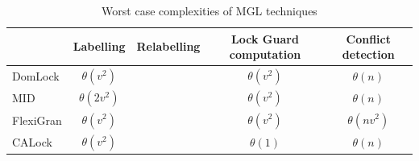 \begin{table}
	\centering
	\captionsetup{justification=centering}
	\begin{tabular}{l | cccc}
				 		& Labelling 					&Relabelling			& Lock Guard computation 			& Conflict detection\\
						\hline
		DomLock 		& $\theta(v^2)$ 				&						& $\theta(v^2)$						& $\theta(n)$\\
		MID 			& $\theta(2v^2)$ 				&						& $\theta(v^2)$ 					& $\theta(n)$\\
		FlexiGran 		& $\theta(v^2)$					&						& $\theta(v^2)$  					& $\theta(n v^2)$\\
		CALock 			& $\theta(v^2)$ 	 			&						& $\theta(1)$ 						& $\theta(n)$
	\end{tabular}\\
	\caption{Worst case complexities of MGL techniques}
\end{table}


	
